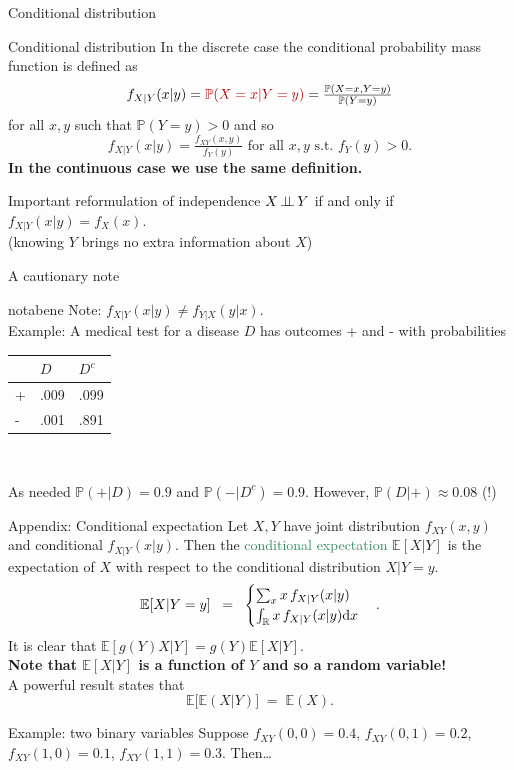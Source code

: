 \documentclass[dvipsnames,aspectratio=169]{beamer} %
\newcommand{\E}{\mathbb{E}}
\renewcommand{\P}{\mathbb{P}}
\newcommand{\R}{\mathbb{R}}
\newcommand{\indep}{\mbox{\,$\perp\!\!\!\perp$\,}}
\begin{document}
\begin{frame}{Conditional distribution}
	\begin{alertblock}{Conditional distribution}
		In the discrete case the conditional probability mass function is defined as
		$$f_{X|Y}(x|y)=\textcolor{DarkRed}{\P(X=x|Y=y)}=\tfrac{\P(X=x,Y=y)}{\P(Y=y)}  $$ 
		for all  $x,y$ such that  $\P(Y=y)>0$ and so $$f_{X|Y}(x|y)=\tfrac{f_{XY}(x,y)}{f_Y(y)} \mbox{ for all } x,y \mbox{ s.t. }f_Y(y)>0. $$ \textbf{In the continuous	case we use the same definition.}\end{alertblock}
		\begin{alertblock}{Important reformulation of independence}
			$X\indep Y$ if and only if $f_{X|Y}(x|y)=f_X(x)$.\\
			(knowing $Y$ brings no extra information about $X$)
		\end{alertblock}

\end{frame}


\begin{frame}{A cautionary note}

	\begin{beamercolorbox}[wd=\paperwidth,sep=2pt]{notabene}	
Note: $f_{X|Y}(x|y)\neq f_{Y|X}(y|x)$.\\[.3cm] Example: A medical test for a disease $D$ has outcomes + and - with probabilities\\ 
{\centering\begin{tabular}{l|ll}
  & $D$  & $D^c$ \\ \hline
+ & .009 & .099  \\
- & .001 & .891 
\end{tabular}\\}
As needed $\P(+|D)=0.9$ and $\P(-|D^c)= 0.9$. However, $\P(D|+)\approx 0.08$ (!)
 \end{beamercolorbox}
\end{frame}



\begin{frame}{Appendix: Conditional expectation}
Let $X,Y$ have joint distribution $f_{XY}(x,y)$ and conditional $f_{X|Y}(x|y)$. Then the \textcolor{SeaGreen}{conditional expectation} $\E[X|Y]$ is the expectation of $X$ with respect to the conditional distribution $X|Y=y$.
$$
\E[X|Y=y]\;\;=\;\;\begin{cases}
	\sum_x x \,f_{X|Y}(x|y)\\
	\int_\R x \,f_{X|Y}(x|y){\rm d}x
\end{cases}.
$$ 
It is clear that $\E[g(Y)X|Y]=g(Y)\E[X|Y]$.\\[.2cm]
\textbf{Note that $\E[X|Y]$ is a function of $Y$ and so a random variable!}\\[.2cm]
A powerful result states that $$\E\big[\E(X|Y)\big]\;=\;\E(X).$$ 	
\vspace{-.4cm}\begin{alertblock}{Example: two binary variables}
	Suppose $f_{XY}(0,0)=0.4$, $f_{XY}(0,1)=0.2$, $f_{XY}(1,0)=0.1$, $f_{XY}(1,1)=0.3$. Then\ldots
\end{alertblock}
\end{frame}
\end{document}
